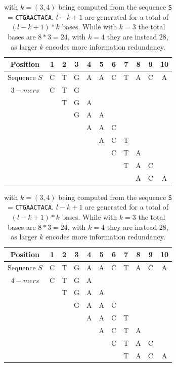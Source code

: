 \begin{table}[!ht]
	\begin{center}
		
		\begin{tabular}{ c c c c c c c c c c c}
			\toprule
			Position & 1 & 2 & 3 & 4 & 5 & 6 & 7 & 8 & 9 & 10 \\
			\midrule
			Sequence $S$ & C & T & G & A & A & C & T &A & C & A\\
			\midrule 
			$3-mers$ & C & T & G  \\
			&   & T & G & A \\
			&   &  & G & A & A \\
			&   &  &  & A & A & C\\
			&   &  &  &  & A & C & T\\
			&   &  &  &  &  & C & T & A \\
			&   &  &  &  &  &  & T & A & C \\
			&   &  &  &  &  & & & A & C & A\\
			
			\hline
		\end{tabular}
		
		\vspace*{0.3 cm}
		
		\centering
		\begin{tabular}{ c c c c c c c c c c c}
			\toprule
			Position & 1 & 2 & 3 & 4 & 5 & 6 & 7 & 8 & 9 & 10 \\
			\midrule
			Sequence $S$ & C & T & G & A & A & C & T &A & C & A\\
			\midrule 
			$4-mers$ & C & T & G & A \\
			&   & T & G & A & A\\
			&   &  & G & A & A & C\\
			&   &  &  & A & A & C & T\\
			&   &  &  &  & A & C & T & A\\
			&   &  &  &  &  & C & T & A & C\\
			&   &  &  &  &  &  & T & A & C & A\\
			
			
			\bottomrule
		\end{tabular}
		\caption[\kmer computation from a sequence]{\kmers with $k=(3,4)$ being computed from the sequence \texttt{S} = \texttt{CTGAACTACA}. $l-k +1$ \kmers are generated for a total of $(l -k + 1) * k$ bases. While with $k=3$ the total bases are $ 8 * 3 = 24$, with $k=4$ they are instead $28$, as larger $k$ encodes more information redundancy.}
		\label{tab-kmers}
	\end{center}
\end{table}


